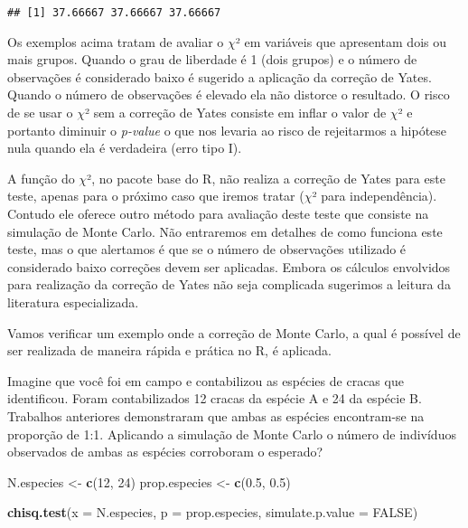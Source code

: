 \documentclass[14pt,titlepage, oneside, openany, a4paper]{book}
\newenvironment{Shaded}{\begin{snugshade}}{\end{snugshade}}
\newcommand{\DataTypeTok}[1]{\textcolor[rgb]{0.13,0.29,0.53}{#1}}
\newcommand{\DecValTok}[1]{\textcolor[rgb]{0.00,0.00,0.81}{#1}}
\newcommand{\FloatTok}[1]{\textcolor[rgb]{0.00,0.00,0.81}{#1}}
\newcommand{\KeywordTok}[1]{\textcolor[rgb]{0.13,0.29,0.53}{\textbf{#1}}}
\newcommand{\NormalTok}[1]{#1}
\newcommand{\OperatorTok}[1]{\textcolor[rgb]{0.81,0.36,0.00}{\textbf{#1}}}
\newcommand{\OtherTok}[1]{\textcolor[rgb]{0.56,0.35,0.01}{#1}}
\newcommand{\StringTok}[1]{\textcolor[rgb]{0.31,0.60,0.02}{#1}}
\begin{document}
\begin{Shaded}
\end{Shaded}

\begin{verbatim}
## [1] 37.66667 37.66667 37.66667
\end{verbatim}

Os exemplos acima tratam de avaliar o \(\chi\)² em variáveis que apresentam dois ou mais grupos. Quando o grau de liberdade é 1 (dois grupos) e o número de observações é considerado baixo é sugerido a aplicação da correção de Yates. Quando o número de observações é elevado ela não distorce o resultado. O risco de se usar o \(\chi\)² sem a correção de Yates consiste em inflar o valor de \(\chi\)² e portanto diminuir o \emph{p-value} o que nos levaria ao risco de rejeitarmos a hipótese nula quando ela é verdadeira (erro tipo I).

A função do \(\chi\)², no pacote base do R, não realiza a correção de Yates para este teste, apenas para o próximo caso que iremos tratar (\(\chi\)² para independência). Contudo ele oferece outro método para avaliação deste teste que consiste na simulação de Monte Carlo. Não entraremos em detalhes de como funciona este teste, mas o que alertamos é que se o número de observações utilizado é considerado baixo correções devem ser aplicadas. Embora os cálculos envolvidos para realização da correção de Yates não seja complicada sugerimos a leitura da literatura especializada.

Vamos verificar um exemplo onde a correção de Monte Carlo, a qual é possível de ser realizada de maneira rápida e prática no R, é aplicada.

Imagine que você foi em campo e contabilizou as espécies de cracas que identificou. Foram contabilizados 12 cracas da espécie A e 24 da espécie B. Trabalhos anteriores demonstraram que ambas as espécies encontram-se na proporção de 1:1. Aplicando a simulação de Monte Carlo o número de indivíduos observados de ambas as espécies corroboram o esperado?

\begin{Shaded}
\begin{Highlighting}[]
\NormalTok{N.especies <-}\StringTok{ }\KeywordTok{c}\NormalTok{(}\DecValTok{12}\NormalTok{, }\DecValTok{24}\NormalTok{)}
\NormalTok{prop.especies <-}\StringTok{ }\KeywordTok{c}\NormalTok{(}\FloatTok{0.5}\NormalTok{, }\FloatTok{0.5}\NormalTok{)}

\KeywordTok{chisq.test}\NormalTok{(}\DataTypeTok{x =}\NormalTok{ N.especies, }\DataTypeTok{p =}\NormalTok{ prop.especies, }\DataTypeTok{simulate.p.value =} \OtherTok{FALSE}\NormalTok{)}
\end{Highlighting}
\end{Shaded}
\end{document}
